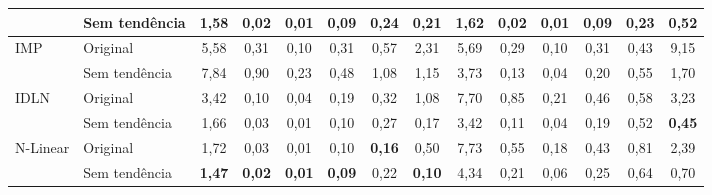 \begin{tabular}{llcccccccccccc}
	                                    & Sem tendência                                   & 1,58                                                           & 0,02          & 0,01          & 0,09          & 0,24          & 0,21          & \textbf{1,62} & \textbf{0,02} & \textbf{0,01} & \textbf{0,09} & 0,23          & 0,52          \\
	\midrule
	\multirow{2}{*}{\ac{IMP}}
	                                    & Original                                        & 5,58                                                           & 0,31          & 0,10          & 0,31          & 0,57          & 2,31          & 5,69          & 0,29          & 0,10          & 0,31          & 0,43          & 9,15          \\
	                                    & Sem tendência                                   & 7,84                                                           & 0,90          & 0,23          & 0,48          & 1,08          & 1,15          & 3,73          & 0,13          & 0,04          & 0,20          & 0,55          & 1,70          \\
	\midrule
	\multirow{2}{*}{\ac{IDLN}}
	                                    & Original                                        & 3,42                                                           & 0,10          & 0,04          & 0,19          & 0,32          & 1,08          & 7,70          & 0,85          & 0,21          & 0,46          & 0,58          & 3,23          \\
	                                    & Sem tendência                                   & 1,66                                                           & 0,03          & 0,01          & 0,10          & 0,27          & 0,17          & 3,42          & 0,11          & 0,04          & 0,19          & 0,52          & \textbf{0,45} \\
	\midrule
	\multirow{2}{*}{\ac{N-Linear}}
	                                    & Original                                        & 1,72                                                           & 0,03          & 0,01          & 0,10          & \textbf{0,16} & 0,50          & 7,73          & 0,55          & 0,18          & 0,43          & 0,81          & 2,39          \\
	                                    & Sem tendência                                   & \textbf{1,47}                                                  & \textbf{0,02} & \textbf{0,01} & \textbf{0,09} & 0,22          & \textbf{0,10} & 4,34          & 0,21          & 0,06          & 0,25          & 0,64          & 0,70          \\

\end{tabular}
